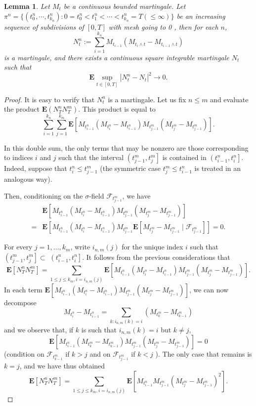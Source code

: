 \documentclass[twoside, 12pt]{book}
\numberwithin{equation}{chapter}
\newtheorem{lemma}[theorem]{Lemma}
\def\bE{{\mathbf E}}
\def\leq{\leqslant}
\begin{document}
	\begin{lemma}\label{lem:quadratic}
		Let $M_t$ be a continuous bounded martingale.  Let $\pi^n=\{(t_0^n,\cdots, t_{k_n}^n): 0=t_0^n<t_1^n<\cdots<t_{k_n}^n=T (\leq \infty)\}$ be an increasing sequence of subdivisions of $[0, T]$ with mesh going to 0 , then for each $n$, 
		$$
		N^n_t:= \sum_{i=1}^{k_n}M_{t_{i-1}}(M_{t_i\wedge t}-M_{t_{i-1}\wedge t})
		$$ 
		is a martingale, and there exists a  continuous square integrable martingale $N_t$ such that 
		\[
		\bE \sup_{t\in [0,T]} |N_t^n-N_t|^2 \to 0. 
		\]
	\end{lemma}
	\begin{proof}
		It is easy to verify that $N_t^n$ is a martingale. 
		Let us fix $n \leq m$ and evaluate the product $\bE\left(N_T^n N_T^m\right)$. This product is equal to
		$$
		\sum_{i=1}^{k_n} \sum_{j=1}^{k_m} \bE\left[M_{t_{i-1}^n}\left(M_{t_i^n}-M_{t_{i-1}^n}\right) M_{t_{j-1}^m}\left(M_{t_j^m}-M_{t_{j-1}^m}\right)\right] .
		$$
		
		In this double sum, the only terms that may be nonzero are those corresponding to indices $i$ and $j$ such that the interval $\left(t_{j-1}^m, t_j^m\right]$ is contained in $\left(t_{i-1}^n, t_i^n\right]$. Indeed, suppose that $t_i^n \leq t_{j-1}^m$ (the symmetric case $t_j^m \leq t_{i-1}^n$ is treated in an analogous way).
		
		Then, conditioning on the $\sigma$-field $\mathscr{F}_{t_{j-1}^m}$, we have
		$$
		\begin{aligned}
			& \bE\left[M_{t_{i-1}^n}\left(M_{t_i^n}-M_{t_{i-1}^n}\right) M_{t_{j-1}^m}\left(M_{t_j^m}-M_{t_{j-1}^m}\right)\right] \\
			=& \bE\left[M_{t_{i-1}^n}\left(M_{t_i^n}-M_{t_{i-1}^n}\right) M_{t_{j-1}^m} \bE\left[M_{t_j^m}-M_{t_{j-1}^m} \mid \mathscr{F}_{t_{j-1}^m}\right]\right]=0 .
		\end{aligned}
		$$
		
		For every $j=1, \ldots, k_m$, write $i_{n, m}(j)$ for the unique index $i$ such that $\left(t_{j-1}^m, t_j^m\right] \subset$ $\left(t_{i-1}^n, t_i^n\right]$. It follows from the previous considerations that
		$$
		\bE\left[N_T^n N_T^m\right]=\sum_{1 \leq j \leq k_m, i=i_{n, m}(j)} \bE\left[M_{t_{i-1}^n}\left(M_{t_i^n}-M_{t_{i-1}^n}\right) M_{t_{j-1}^m}\left(M_{t_j^m}-M_{t_{j-1}^m}\right)\right] .
		$$
		In each term $\bE\left[M_{t_{i-1}^n}\left(M_{t_i^n}-M_{t_{i-1}^n}\right) M_{t_{j-1}^m}\left(M_{t_j^m}-M_{t_{j-1}^m}\right)\right]$, we can now decompose
		$$
		M_{t_i^n}-M_{t_{i-1}^n}=\sum_{k: i_{n, m}(k)=i}\left(M_{t_k^m}-M_{t_{k-1}^m}\right)
		$$
		and we observe that, if $k$ is such that $i_{n, m}(k)=i$ but $k \neq j$,
		$$
		\bE\left[M_{t_{i-1}^n}\left(M_{t_k^m}-M_{t_{k-1}^m}\right) M_{t_{j-1}^m}\left(M_{t_j^m}-M_{t_{j-1}^m}\right)\right]=0
		$$
		(condition on $\mathscr{F}_{t_{k-1}^m}$ if $k>j$ and on $\mathscr{F}_{t_{j-1}^m}$ if $k<j$ ). The only case that remains is $k=j$, and we have thus obtained
		$$
		\bE\left[N_T^n N_T^m\right]=\sum_{1 \leq j \leq k_m, i=i_{n, m}(j)} \bE\left[M_{t_{i-1}^n} M_{t_{j-1}^m}\left(M_{t_j^m}-M_{t_{j-1}^m}\right)^2\right] .
		$$
		

\end{proof}
\end{document}
